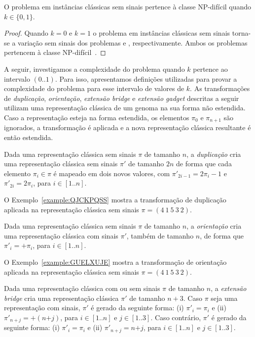 \begin{lemma}
O problema \SbPRT{} em instâncias clássicas sem sinais pertence à classe NP-difícil quando $k \in \{0,1\}$.
\end{lemma}
\begin{proof}
Quando $k=0$ e $k=1$ o problema \SbPRT{} em instâncias clássicas sem sinais torna-se a variação sem sinais dos problemas \SbRT{} e \SbR{}, respectivamente. Ambos os problemas pertencem à classe NP-difícil~\cite{2019b-oliveira-etal,1999a-caprara}.
\end{proof}

A seguir, investigamos a complexidade do problema \SbPRT{} quando $k$ pertence ao intervalo $(0..1)$. Para isso, apresentamos definições utilizadas para provar a complexidade do problema para esse intervalo de valores de $k$. As transformações de \emph{duplicação}, \emph{orientação}, \emph{extensão bridge} e \emph{extensão gadget} descritas a seguir utilizam uma representação clássica de um genoma na sua forma não estendida. Caso a representação esteja na forma estendida, os elementos $\pi_0$ e $\pi_{n+1}$ são ignorados, a transformação é aplicada e a nova representação clássica resultante é então estendida.

\begin{definition}
Dada uma representação clássica sem sinais $\pi$ de tamanho $n$, a \emph{duplicação} cria uma representação clássica sem sinais $\pi'$ de tamanho $2n$ de forma que cada elemento $\pi_i \in \pi$ é mapeado em dois novos valores, com $\pi'_{2i-1} = 2\pi_i-1$ e $\pi'_{2i} = 2\pi_i$, para $i \in [1..n]$.
\end{definition}

O Exemplo~\ref{example:QJCKPQSS} mostra a transformação de duplicação aplicada na representação clássica sem sinais $\pi=(4~1~5~3~2)$.



\begin{definition}
Dada uma representação clássica sem sinais $\pi$ de tamanho $n$, a \emph{orientação} cria uma representação clássica com sinais $\pi'$, também de tamanho $n$, de forma que $\pi'_{i} = +\pi_i$, para $i \in [1..n]$.
\end{definition}

O Exemplo~\ref{example:GUELXUJE} mostra a transformação de orientação aplicada na representação clássica sem sinais $\pi=(4~1~5~3~2)$.



\begin{definition}
Dada uma representação clássica com ou sem sinais $\pi$ de tamanho $n$, a \emph{extensão bridge} cria uma representação clássica $\pi'$ de tamanho $n + 3$. Caso $\pi$ seja uma representação com sinais, $\pi'$ é gerado da seguinte forma: (i) $\pi'_{i} = \pi_i$ e (ii) $\pi'_{n+j} = +(n{+j})$, para $i \in [1..n]$ e $j \in [1..3]$. Caso contrário, $\pi'$ é gerado da seguinte forma: (i) $\pi'_{i} = \pi_i$ e (ii) $\pi'_{n+j} = n{+j}$, para $i \in [1..n]$ e $j \in [1..3]$.
\end{definition}

